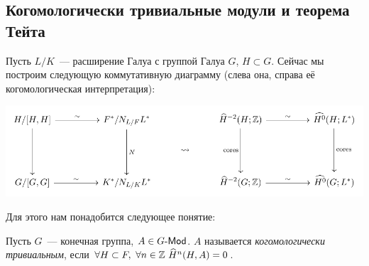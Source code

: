 \subsection{Когомологически тривиальные модули и теорема Тейта}

	Пусть $L/K$~--- расширение Галуа с группой Галуа $G$, $H \subset G$. Сейчас мы  построим следующую коммутативную диаграмму  (слева она, справа её когомологическая интерпретация):
	\begin{center}
			\includegraphics{lectures/6/pictures/cd_33.pdf}
	\end{center}

	Для этого нам понадобится следующее понятие: 

	\begin{definition} 
		Пусть $G$~--- конечная группа, $A \in G\text{-}\mathsf{Mod}$. $A$ называется \emph{когомологически тривиальным}, если $\forall H \subset F, \ \forall n \in \Z \ \widehat{H}^n(H, A) = 0$. 
	\end{definition}

